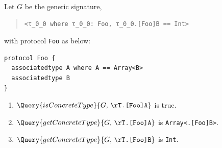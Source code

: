 \documentclass[../generics]{subfiles}
\begin{document}
\begin{example}\label{concrete type query example}
Let $G$ be the generic signature,
\begin{quote}
\begin{verbatim}
<τ_0_0 where τ_0_0: Foo, τ_0_0.[Foo]B == Int>
\end{verbatim}
\end{quote}
with protocol \texttt{Foo} as below:
\begin{Verbatim}
protocol Foo {
  associatedtype A where A == Array<B>
  associatedtype B
}
\end{Verbatim}
\begin{enumerate}
\item $\Query{isConcreteType}{G,\,\texttt{\rT.[Foo]A}}$ is true.
\item $\Query{getConcreteType}{G,\,\texttt{\rT.[Foo]A}}$ is \texttt{Array<\rT.[Foo]B>}.
\item $\Query{getConcreteType}{G,\,\texttt{\rT.[Foo]B}}$ is \texttt{Int}.
\end{enumerate}
\end{example}
\end{document}
